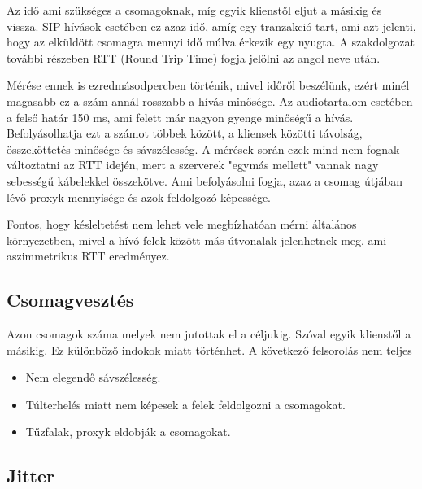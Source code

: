 Az idő ami szükséges a csomagoknak, míg egyik klienstől eljut a másikig és vissza. SIP
hívások esetében ez azaz idő, amíg egy tranzakció tart, ami azt jelenti, hogy az elküldött
csomagra mennyi idő múlva érkezik egy nyugta. A szakdolgozat további részeben RTT (Round Trip Time)
fogja jelölni az angol neve után. 

Mérése ennek is ezredmásodpercben történik, mivel időről beszélünk, ezért minél magasabb ez a
szám annál rosszabb a hívás minősége. Az audiotartalom esetében a felső határ 150 ms, ami felett
már nagyon gyenge minőségű a hívás. Befolyásolhatja ezt a számot többek között, a kliensek 
közötti távolság, összeköttetés minősége és sávszélesség. A mérések során ezek mind nem fognak
változtatni az RTT idején, mert a szerverek "egymás mellett" vannak nagy sebességű kábelekkel
összekötve. Ami befolyásolni fogja, azaz a csomag útjában lévő proxyk mennyisége és azok feldolgozó
képessége. 

Fontos, hogy késleltetést nem lehet vele megbízhatóan mérni általános környezetben, mivel a hívó
felek között más útvonalak jelenhetnek meg, ami aszimmetrikus RTT eredményez. 

%

\subsection{Csomagvesztés}

Azon csomagok száma melyek nem jutottak el a céljukig. Szóval egyik klienstől a másikig. Ez különböző
indokok miatt történhet. A következő felsorolás nem teljes \cite{measure}

\begin{itemize}
	\item Nem elegendő sávszélesség. 
	\item Túlterhelés miatt nem képesek a felek feldolgozni a csomagokat.
	\item Tűzfalak, proxyk eldobják a csomagokat. 
\end{itemize}

\subsection{Jitter}


